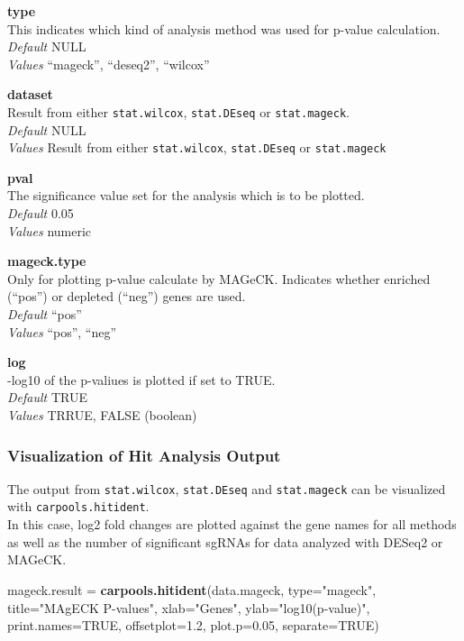 \documentclass[]{article}
\newenvironment{Shaded}{\begin{snugshade}}{\end{snugshade}}
\newcommand{\KeywordTok}[1]{\textcolor[rgb]{0.13,0.29,0.53}{\textbf{{#1}}}}
\newcommand{\DataTypeTok}[1]{\textcolor[rgb]{0.13,0.29,0.53}{{#1}}}
\newcommand{\FloatTok}[1]{\textcolor[rgb]{0.00,0.00,0.81}{{#1}}}
\newcommand{\StringTok}[1]{\textcolor[rgb]{0.31,0.60,0.02}{{#1}}}
\newcommand{\OtherTok}[1]{\textcolor[rgb]{0.56,0.35,0.01}{{#1}}}
\newcommand{\NormalTok}[1]{{#1}}
\begin{document}
\textbf{type}\\
This indicates which kind of analysis method was used for p-value
calculation.\\
\emph{Default} NULL\\
\emph{Values} ``mageck'', ``deseq2'', ``wilcox''

\textbf{dataset}\\
Result from either \texttt{stat.wilcox}, \texttt{stat.DEseq} or
\texttt{stat.mageck}.\\
\emph{Default} NULL\\
\emph{Values} Result from either \texttt{stat.wilcox},
\texttt{stat.DEseq} or \texttt{stat.mageck}

\textbf{pval}\\
The significance value set for the analysis which is to be plotted.\\
\emph{Default} 0.05\\
\emph{Values} numeric

\textbf{mageck.type}\\
Only for plotting p-value calculate by MAGeCK. Indicates whether
enriched (``pos'') or depleted (``neg'') genes are used.\\
\emph{Default} ``pos''\\
\emph{Values} ``pos'', ``neg''

\textbf{log}\\
-log10 of the p-valiues is plotted if set to TRUE.\\
\emph{Default} TRUE\\
\emph{Values} TRRUE, FALSE (boolean)

\subsubsection{Visualization of Hit Analysis
Output}\label{visualization-of-hit-analysis-output}

The output from \texttt{stat.wilcox}, \texttt{stat.DEseq} and
\texttt{stat.mageck} can be visualized with
\texttt{carpools.hitident}.\\
In this case, log2 fold changes are plotted against the gene names for
all methods as well as the number of significant sgRNAs for data
analyzed with DESeq2 or MAGeCK.

\begin{Shaded}
\begin{Highlighting}[]
\NormalTok{mageck.result =}\StringTok{ }\KeywordTok{carpools.hitident}\NormalTok{(data.mageck, }\DataTypeTok{type=}\StringTok{"mageck"}\NormalTok{,}
      \DataTypeTok{title=}\StringTok{"MAgECK P-values"}\NormalTok{, }\DataTypeTok{xlab=}\StringTok{"Genes"}\NormalTok{, }\DataTypeTok{ylab=}\StringTok{"log10(p-value)"}\NormalTok{,}
      \DataTypeTok{print.names=}\OtherTok{TRUE}\NormalTok{, }\DataTypeTok{offsetplot=}\FloatTok{1.2}\NormalTok{, }\DataTypeTok{plot.p=}\FloatTok{0.05}\NormalTok{, }\DataTypeTok{separate=}\OtherTok{TRUE}\NormalTok{)}
\end{Highlighting}
\end{Shaded}
\end{document}
